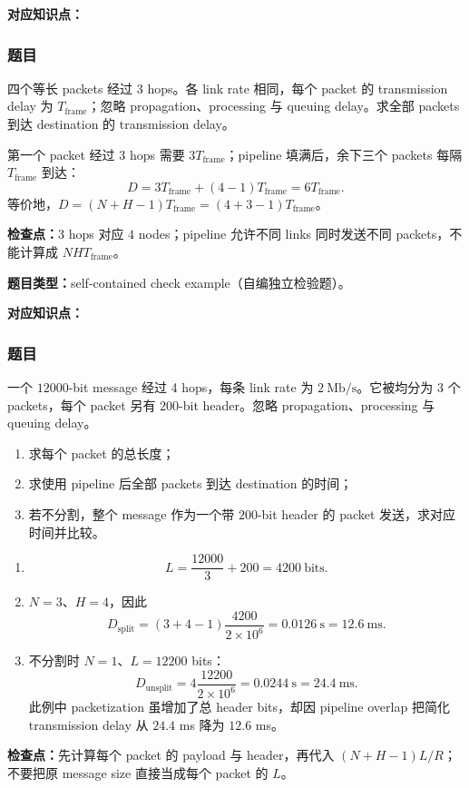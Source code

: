 \textbf{对应知识点：}

\subsubsection*{题目}

四个等长 packets 经过 3 hops。各 link rate 相同，每个 packet 的 transmission delay 为 $T_{\mathrm{frame}}$；忽略 propagation、processing 与 queuing delay。求全部 packets 到达 destination 的 transmission delay。

\begin{checkedsolution}
第一个 packet 经过 3 hops 需要 $3T_{\mathrm{frame}}$；pipeline 填满后，余下三个 packets 每隔 $T_{\mathrm{frame}}$ 到达：
\[
  D=3T_{\mathrm{frame}}+(4-1)T_{\mathrm{frame}}
   =\boxed{6T_{\mathrm{frame}}}.
\]
等价地，$D=(N+H-1)T_{\mathrm{frame}}=(4+3-1)T_{\mathrm{frame}}$。
\end{checkedsolution}

\textbf{检查点：}$3$ hops 对应 $4$ nodes；pipeline 允许不同 links 同时发送不同 packets，不能计算成 $NH T_{\mathrm{frame}}$。


\textbf{题目类型：}self-contained check example（自编独立检验题）。

\textbf{对应知识点：}

\subsubsection*{题目}

一个 $12000$-bit message 经过 4 hops，每条 link rate 为 $2\ \mathrm{Mb/s}$。它被均分为 3 个 packets，每个 packet 另有 $200$-bit header。忽略 propagation、processing 与 queuing delay。
\begin{enumerate}[label=(\alph*)]
  \item 求每个 packet 的总长度；
  \item 求使用 pipeline 后全部 packets 到达 destination 的时间；
  \item 若不分割，整个 message 作为一个带 $200$-bit header 的 packet 发送，求对应时间并比较。
\end{enumerate}

\begin{checkedsolution}
\begin{enumerate}[label=(\alph*)]
  \item
  \[
    L=\frac{12000}{3}+200=\boxed{4200\ \mathrm{bits}}.
  \]
  \item $N=3$、$H=4$，因此
  \[
    D_{\mathrm{split}}
    =(3+4-1)\frac{4200}{2\times10^6}
    =\boxed{0.0126\ \mathrm{s}=12.6\ \mathrm{ms}}.
  \]
  \item 不分割时 $N=1$、$L=12200$ bits：
  \[
    D_{\mathrm{unsplit}}
    =4\frac{12200}{2\times10^6}
    =\boxed{0.0244\ \mathrm{s}=24.4\ \mathrm{ms}}.
  \]
  此例中 packetization 虽增加了总 header bits，却因 pipeline overlap 把简化 transmission delay 从 $24.4$ ms 降为 $12.6$ ms。
\end{enumerate}
\end{checkedsolution}

\textbf{检查点：}先计算每个 packet 的 payload 与 header，再代入 $(N+H-1)L/R$；不要把原 message size 直接当成每个 packet 的 $L$。
